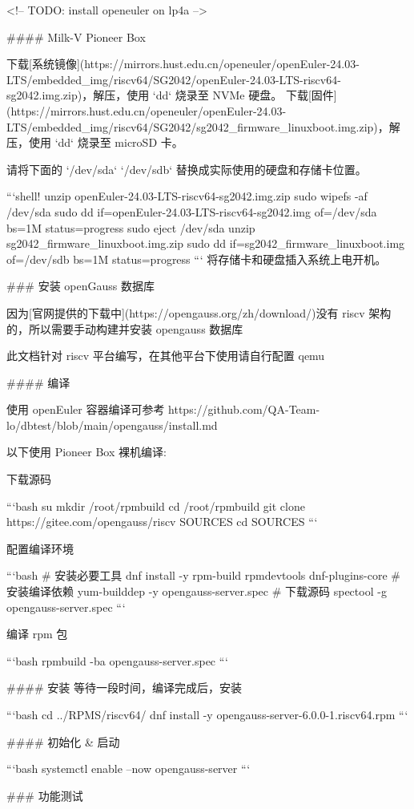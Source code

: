 \documentclass{article}
\begin{document}
\begin{markdown}
<!-- TODO: install openeuler on lp4a -->

#### Milk-V Pioneer Box

下载[系统镜像](https://mirrors.hust.edu.cn/openeuler/openEuler-24.03-LTS/embedded_img/riscv64/SG2042/openEuler-24.03-LTS-riscv64-sg2042.img.zip)，解压，使用 `dd` 烧录至 NVMe 硬盘。
下载[固件](https://mirrors.hust.edu.cn/openeuler/openEuler-24.03-LTS/embedded_img/riscv64/SG2042/sg2042_firmware_linuxboot.img.zip)，解压，使用 `dd` 烧录至 microSD 卡。

请将下面的 `/dev/sda` `/dev/sdb` 替换成实际使用的硬盘和存储卡位置。

```shell!
unzip openEuler-24.03-LTS-riscv64-sg2042.img.zip
sudo wipefs -af /dev/sda
sudo dd if=openEuler-24.03-LTS-riscv64-sg2042.img of=/dev/sda bs=1M status=progress
sudo eject /dev/sda
unzip sg2042_firmware_linuxboot.img.zip
sudo dd if=sg2042_firmware_linuxboot.img of=/dev/sdb bs=1M status=progress
```
将存储卡和硬盘插入系统上电开机。

### 安装 openGauss 数据库

因为[官网提供的下载中](https://opengauss.org/zh/download/)没有 riscv 架构的，所以需要手动构建并安装 opengauss 数据库

此文档针对 riscv 平台编写，在其他平台下使用请自行配置 qemu

#### 编译

使用 openEuler 容器编译可参考 https://github.com/QA-Team-lo/dbtest/blob/main/opengauss/install.md

以下使用 Pioneer Box 裸机编译:

下载源码

```bash
su 
mkdir /root/rpmbuild
cd /root/rpmbuild
git clone https://gitee.com/opengauss/riscv SOURCES
cd SOURCES
```

配置编译环境

```bash
# 安装必要工具
dnf install -y rpm-build rpmdevtools dnf-plugins-core
# 安装编译依赖
yum-builddep -y opengauss-server.spec
# 下载源码
spectool -g opengauss-server.spec
```

编译 rpm 包

```bash
rpmbuild -ba opengauss-server.spec
```

#### 安装
等待一段时间，编译完成后，安装

```bash
cd ../RPMS/riscv64/
dnf install -y opengauss-server-6.0.0-1.riscv64.rpm
```

#### 初始化 & 启动

```bash
systemctl enable --now opengauss-server
```

### 功能测试


\end{markdown}
\end{document}
